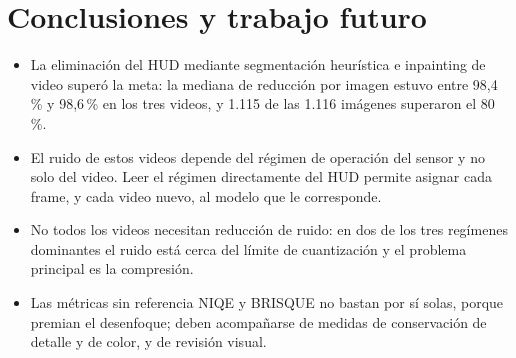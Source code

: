 \section{Conclusiones y trabajo futuro}
\label{sec:conclusiones}
\begin{itemize}
    \item La eliminación del HUD mediante segmentación heurística e inpainting de video superó la meta: la mediana de reducción por imagen estuvo entre 98,4\,\% y 98,6\,\% en los tres videos, y 1.115 de las 1.116 imágenes superaron el 80\,\%.
    \item El ruido de estos videos depende del régimen de operación del sensor y no solo del video. Leer el régimen directamente del HUD permite asignar cada frame, y cada video nuevo, al modelo que le corresponde.
    \item No todos los videos necesitan reducción de ruido: en dos de los tres regímenes dominantes el ruido está cerca del límite de cuantización y el problema principal es la compresión.
    \item Las métricas sin referencia NIQE y BRISQUE no bastan por sí solas, porque premian el desenfoque; deben acompañarse de medidas de conservación de detalle y de color, y de revisión visual.
\end{itemize}

